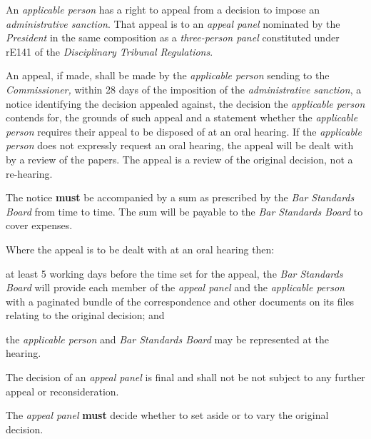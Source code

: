 An \emph{applicable person} has a right to appeal from a decision to
impose an \emph{administrative sanction}. That appeal is to
an \emph{appeal panel} nominated by the \emph{President} in the same
composition as a \emph{three-person panel} constituted under rE141 of
the \emph{Disciplinary Tribunal Regulations}.

\par
An appeal, if made, shall be made by the \emph{applicable
person} sending to the \emph{Commissioner,} within 28 days of the
imposition of the \emph{administrative sanction}, a notice identifying
the decision appealed against, the decision the \emph{applicable
person} contends for, the grounds of such appeal and a statement whether
the \emph{applicable person} requires their appeal to be disposed of at
an oral hearing. If the \emph{applicable person} does not expressly
request an oral hearing, the appeal will be dealt with by a review of
the papers. The appeal is a review of the original decision, not a
re-hearing.\\
\par
The notice  \textcolor{myred}{\textbf{must}} be accompanied by a sum as prescribed by the \emph{Bar
Standards Board} from time to time. The sum will be payable to
the \emph{Bar Standards Board} to cover expenses.\\
\par
Where the appeal is to be dealt with at an oral hearing then:\\\nl \item at least 5 working days before the time set for the appeal,
the \emph{Bar Standards Board} will provide each member of
the \emph{appeal panel} and the \emph{applicable person} with a
paginated bundle of the correspondence and other documents on its files
relating to the original decision; and\item the \emph{applicable person} and \emph{Bar Standards Board} may be
represented at the hearing.\ln
{}\par
The decision of an \emph{appeal panel} is final and shall not be not
subject to any further appeal or reconsideration.\\
\par
The \emph{appeal panel}  \textcolor{myred}{\textbf{must}} decide whether to set aside or to vary the
original decision.\\
\par
